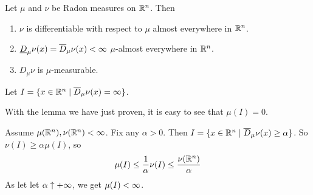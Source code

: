 \documentclass[x11names,reqno,14pt]{extarticle}
\begin{document}
\thm Let $\mu$ and $\nu$ be Radon measures on $\mathbb{R}^n$. Then

\begin{enumerate}[label=(\roman*)]

\item $\nu$ is differentiable with respect to $\mu$ almost everywhere in $\mathbb{R}^n$. 

\item $\underline{D}_\mu\nu(x) = \overline{D}_\mu\nu(x)<\infty$ $\mu$-almost everywhere in $\mathbb{R}^n$. 

\item $D_\mu\nu$ is $\mu$-measurable. 

\end{enumerate}

\proof

Let $I = \{x\in\mathbb{R}^n \mid \overline{D}_\mu\nu(x) = \infty\}$. 

With the lemma we have just proven, it is easy to see that $\mu(I) = 0$. 

Assume $\mu(\mathbb{R}^n),\nu(\mathbb{R}^n) < \infty$. Fix any $\alpha>0$. Then $I = \{x\in\mathbb{R}^n\mid\overline{D}_\mu\nu(x)\geq\alpha\}$. So $\nu(I)\geq\alpha\mu(I)$, so
\[
\mu(I)\leq\frac{1}{\alpha}\nu(I)\leq\frac{\nu(\mathbb{R}^n)}{\alpha}
\]
As let let $\alpha\uparrow+\infty$, we get $\mu(I)<\infty$. 
\end{document}

